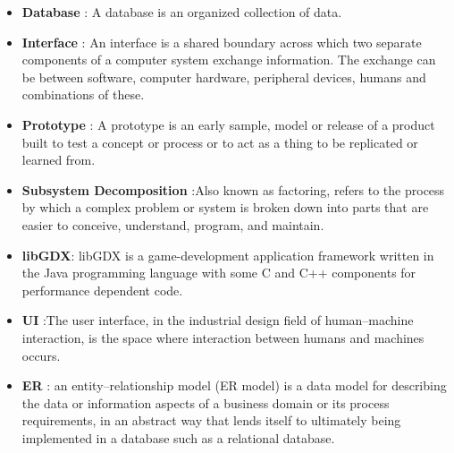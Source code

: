 \documentclass{article}
\begin{document}
	\begin{itemize}
		\item \textbf{Database} : A database is an organized collection of data.
		\item \textbf{Interface} : An interface is a shared boundary across which two separate components of a computer system exchange information. The exchange can be between software, computer hardware, peripheral devices, humans and combinations of these. 
		\item \textbf{Prototype} : A prototype is an early sample, model or release of a product built to test a concept or process or to act as a thing to be replicated or learned from.\\
		\item \textbf{Subsystem Decomposition} :Also known as factoring, refers to the process by which a complex problem or system is broken down into parts that are easier to conceive, understand, program, and maintain.\\
		\item \textbf{libGDX}: libGDX is a game-development application framework written in the Java programming language with some C and C++ components for performance dependent code.\\
		\item \textbf{UI} :The user interface, in the industrial design field of human–machine interaction, is the space where interaction between humans and machines occurs.\\
		\item \textbf{ER} : an entity–relationship model (ER model) is a data model for describing the data or information aspects of a business domain or its process requirements, in an abstract way that lends itself to ultimately being implemented in a database such as a relational database.\\


	\end{itemize}


	
\end{document}
